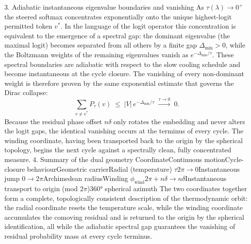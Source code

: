 3. Adiabatic instantaneous eigenvalue boundaries and vanishing
As \(\tau(\lambda)\to0^+\) the steered softmax concentrates exponentially onto the unique highest-logit permitted token \(v^*\). In the language of the logit operator this concentration is equivalent to the emergence of a spectral gap: the dominant eigenvalue (the maximal logit) becomes separated from all others by a finite gap \(\Delta_{\min}>0\), while the Boltzmann weights of the remaining eigenvalues vanish as \(e^{-\Delta_{\min}/\tau}\).
These spectral boundaries are adiabatic with respect to the slow cooling schedule and become instantaneous at the cycle closure. The vanishing of every non-dominant weight is therefore proven by the same exponential estimate that governs the Dirac collapse:
\[
\sum_{v\neq v^*}P_{\tau}(v)\;\le\;|V|\,e^{-\Delta_{\min}/\tau}\;\xrightarrow{\tau\to0}\;0.
\]
Because the residual phase offset \(n\delta\) only rotates the embedding and never alters the logit gaps, the identical vanishing occurs at the terminus of every cycle. The winding coordinate, having been transported back to the origin by the spherical topology, begins the next cycle against a spectrally clean, fully concentrated measure.
4. Summary of the dual geometry
CoordinateContinuous motionCycle-closure behaviourGeometric carrierRadial (temperature) \(\tau\)\(2\pi\to0\)Instantaneous jump \(0\to2\pi\)Archimedean radiusWinding \(\phi_{\mathrm{wind}}\)\(2\pi+n\delta\to n\delta\)Instantaneous transport to origin (mod \(2\pi\))360° spherical azimuth
The two coordinates together form a complete, topologically consistent description of the thermodynamic orbit: the radial coordinate resets the temperature scale, while the winding coordinate accumulates the comoving residual and is returned to the origin by the spherical identification, all while the adiabatic spectral gap guarantees the vanishing of residual probability mass at every cycle terminus.

